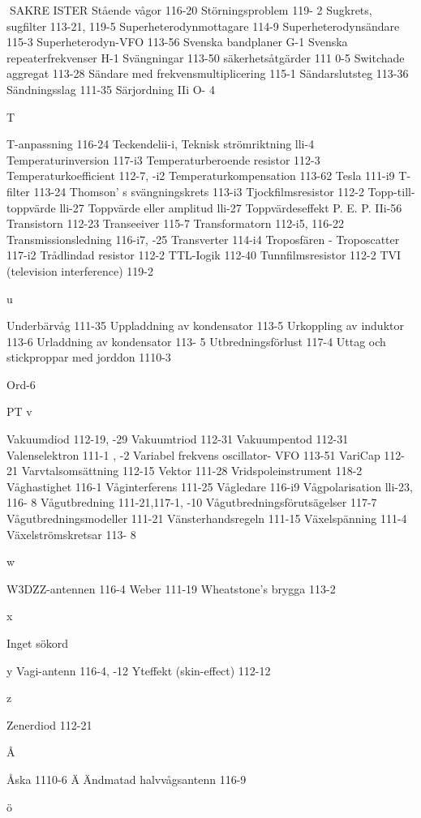 SAKRE ISTER
Stående vågor 116-20
Störningsproblem 119- 2
Sugkrets, sugfilter 113-21, 119-5
Superheterodynmottagare 114-9
Superheterodynsändare 115-3
Superheterodyn-VFO 113-56
Svenska bandplaner G-1
Svenska repeaterfrekvenser H-1
Svängningar 113-50
säkerhetsåtgärder 111 0-5
Switchade aggregat 113-28
Sändare med frekvensmultiplicering 115-1
Sändarslutsteg 113-36
Sändningsslag 111-35
Särjordning IIi O- 4

T

T-anpassning 116-24
Teckendelii-i,
Teknisk strömriktning lli-4
Temperaturinversion 117-i3
Temperaturberoende resistor 112-3
Temperaturkoefficient 112-7, -i2
Temperaturkompensation 113-62
Tesla 111-i9
T-filter 113-24
Thomson' s svängningskrets 113-i3
Tjockfilmsresistor 112-2
Topp-till-toppvärde lli-27
Toppvärde eller amplitud lli-27
Toppvärdeseffekt P. E. P. IIi-56
Transistorn 112-23
Transeeiver 115-7
Transformatorn 112-i5, 116-22
Transmissionsledning 116-i7, -25
Transverter 114-i4
Troposfären - Troposcatter 117-i2
Trådlindad resistor 112-2
TTL-Iogik 112-40
Tunnfilmsresistor 112-2
TVI (television interference) 119-2

u

Underbärvåg 111-35
Uppladdning av kondensator 113-5
Urkoppling av induktor 113-6
Urladdning av kondensator 113- 5
Utbredningsförlust 117-4
Uttag och stickproppar med jorddon 1110-3

Ord-6

PT
v

Vakuumdiod 112-19, -29
Vakuumtriod 112-31
Vakuumpentod 112-31
Valenselektron 111-1 , -2
Variabel frekvens oscillator- VFO 113-51
VariCap 112-21
Varvtalsomsättning 112-15
Vektor 111-28
Vridspoleinstrument 118-2
Våghastighet 116-1
Våginterferens 111-25
Vågledare 116-i9
Vågpolarisation lli-23, 116- 8
Vågutbredning 111-21,117-1, -10
Vågutbredningsförutsägelser 117-7
Vågutbredningsmodeller 111-21
Vänsterhandsregeln 111-15
Växelspänning 111-4
Växelströmskretsar 113- 8

w

W3DZZ-antennen 116-4
Weber 111-19
Wheatstone's brygga 113-2

x

Inget sökord

y
Vagi-antenn 116-4, -12
Yteffekt (skin-effect) 112-12

z

Zenerdiod 112-21

Å

Åska 1110-6
Ä
Ändmatad halvvågsantenn 116-9

ö

